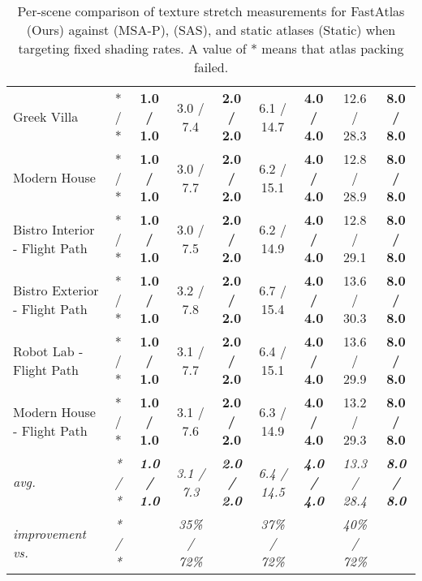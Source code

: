 \begin{table*}[t]
\begin{tabular}{l cc|cc|cc|cc}
            		Greek Villa                   & * / *                & \textbf{1.0 / 1.0}          & 3.0 / 7.4            & \textbf{2.0 / 2.0}          & 6.1 / 14.7           & \textbf{4.0 / 4.0}          & 12.6 / 28.3          & \textbf{8.0 / 8.0}          \\
            		Modern House                  & * / *                & \textbf{1.0 / 1.0}          & 3.0 / 7.7            & \textbf{2.0 / 2.0}          & 6.2 / 15.1           & \textbf{4.0 / 4.0}          & 12.8 / 28.9          & \textbf{8.0 / 8.0}          \\
            		Bistro Interior - Flight Path & * / *                & \textbf{1.0 / 1.0}          & 3.0 / 7.5            & \textbf{2.0 / 2.0}          & 6.2 / 14.9           & \textbf{4.0 / 4.0}          & 12.8 / 29.1          & \textbf{8.0 / 8.0}          \\
            		Bistro Exterior - Flight Path & * / *                & \textbf{1.0 / 1.0}          & 3.2 / 7.8            & \textbf{2.0 / 2.0}          & 6.7 / 15.4           & \textbf{4.0 / 4.0}          & 13.6 / 30.3          & \textbf{8.0 / 8.0}          \\
            		Robot Lab - Flight Path       & * / *                & \textbf{1.0 / 1.0}          & 3.1 / 7.7            & \textbf{2.0 / 2.0}          & 6.4 / 15.1           & \textbf{4.0 / 4.0}          & 13.6 / 29.9          & \textbf{8.0 / 8.0}          \\
            		Modern House - Flight Path    & * / *                & \textbf{1.0 / 1.0}          & 3.1 / 7.6            & \textbf{2.0 / 2.0}          & 6.3 / 14.9           & \textbf{4.0 / 4.0}          & 13.2 / 29.3          & \textbf{8.0 / 8.0}          \\
            		\hline
            		\textit{avg.} & \textit{* / *} & \textit{\textbf{1.0 / 1.0}} & \textit{3.1 / 7.3} & \textit{\textbf{2.0 / 2.0}} & \textit{6.4 / 14.5}  & \textit{\textbf{4.0 / 4.0}} & \textit{13.3 / 28.4} & \textit{\textbf{8.0 / 8.0}} \\
            		\textit{improvement vs.} & \textit{* / *} & & \textit{35\% / 72\%} & & \textit{37\% / 72\%} & & \textit{40\% / 72\%} &
            		\\                           
	\end{tabular}
	\vspace{1mm}
	\caption{Per-scene comparison of texture stretch measurements for FastAtlas (Ours) against \cite{Neff2022MSA} (MSA-P), \cite{mueller2018shading} (SAS), and static atlases (Static) when targeting fixed shading rates. A value of * means that atlas packing failed.}
	\label{tab:supp_texture_stretch_fixed_atlas}
	\vspace{-3mm}
\end{table*}
